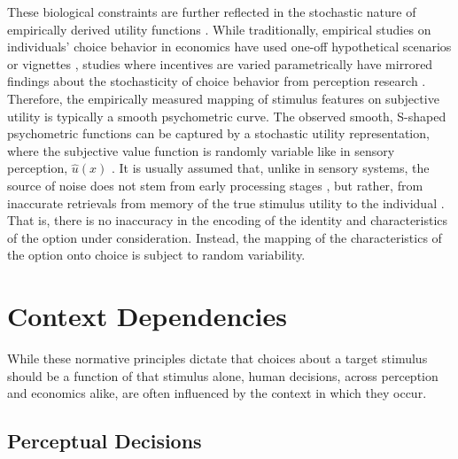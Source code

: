 \documentclass[a4paper, nobind]{templates/ociamthesis}
\begin{document}
These biological constraints are further reflected in the stochastic nature of empirically derived utility functions \autocites[e.g.][]{luce1959,block1960,mcfadden1981}. While traditionally, empirical studies on individuals' choice behavior in economics have used one-off hypothetical scenarios or vignettes \autocite[e.g.][]{kahneman1979}, studies where incentives are varied parametrically have mirrored findings about the stochasticity of choice behavior from perception research \autocite[e.g.][]{mosteller1951}. Therefore, the empirically measured mapping of stimulus features on subjective utility is typically a smooth psychometric curve. The observed smooth, S-shaped psychometric functions can be captured by a stochastic utility representation, where the subjective value function is randomly variable like in sensory perception, \(\hat{u}(x)\) \autocite[as in random utility models,][]{mcfadden1981}. It is usually assumed that, unlike in sensory systems, the source of noise does not stem from early processing stages \autocites[although noise might affect the encoding of both value,][]{bhui2018}[and probability][]{steiner2016}, but rather, from inaccurate retrievals from memory of the true stimulus utility to the individual \autocite[e.g.][]{polania2018}. That is, there is no inaccuracy in the encoding of the identity and characteristics of the option under consideration. Instead, the mapping of the characteristics of the option onto choice is subject to random variability.

\hypertarget{context-dependencies}{%
\section{Context Dependencies}\label{context-dependencies}}

While these normative principles dictate that choices about a target stimulus should be a function of that stimulus alone, human decisions, across perception and economics alike, are often influenced by the context in which they occur.

\hypertarget{perceptual-decisions}{%
\subsection{Perceptual Decisions}\label{perceptual-decisions}}
\end{document}
